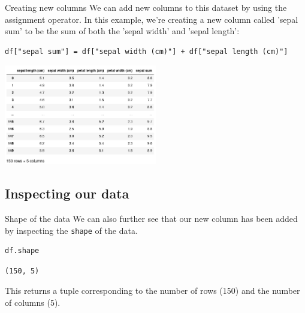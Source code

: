 \documentclass[10pt]{beamer}
\begin{document}
\begin{frame}[label={sec:orgee6cf72},fragile]{Creating new columns}
 We can add new columns to this dataset by using the assignment operator. In this
example, we're creating a new column called 'sepal sum' to be the sum of both
the 'sepal width' and 'sepal length':

\begin{verbatim}
df["sepal sum"] = df["sepal width (cm)"] + df["sepal length (cm)"]
\end{verbatim}

\begin{center}
\includegraphics[width=0.5\textwidth]{images/new-column.png}
\end{center}
\end{frame}

\subsection{Inspecting our data}
\label{sec:org5cfa47f}

\begin{frame}[label={sec:org6a6989a},fragile]{Shape of the data}
 We can also further see that our new column has been added by inspecting the
\texttt{shape} of the data.

\begin{verbatim}
df.shape
\end{verbatim}

\begin{verbatim}
(150, 5)
\end{verbatim}

This returns a tuple corresponding to the number of rows (150) and the number of
columns (5).
\end{frame}
\end{document}
